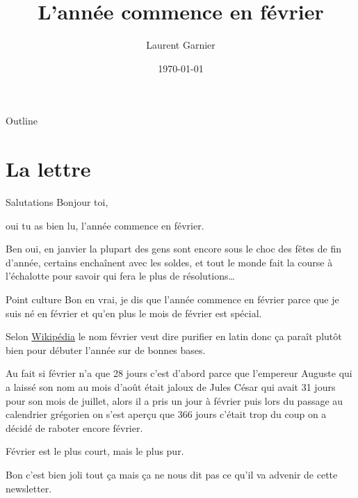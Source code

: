 \documentclass[presentation]{beamer}
\author{Laurent Garnier}
\date{\today}
\title{L'année commence en février}
\begin{document}
\maketitle
\begin{frame}{Outline}
\tableofcontents
\end{frame}


\section{La lettre}
\label{sec:org4ca9ffe}
\begin{frame}[label={sec:org9dab359}]{Salutations}
Bonjour toi,



oui tu as bien lu, l'année commence en février. 



Ben oui, en janvier la plupart des gens sont encore sous le choc des
fêtes de fin d'année, certains enchaînent avec les soldes, et tout le
monde fait la course à l'échalotte pour savoir qui fera le plus de
résolutions\ldots{}
\end{frame}



\begin{frame}[label={sec:org131f08e}]{Point culture}
Bon en vrai, je dis que l'année commence en février parce que je suis
né en février et qu'en plus le mois de février est spécial.




Selon \href{https://fr.wikipedia.org/wiki/F\%25C3\%25A9vrier}{Wikipédia} le nom février veut dire purifier en latin donc ça
paraît plutôt bien pour débuter l'année sur de bonnes bases. 




Au fait si février n'a que 28 jours c'est d'abord parce que l'empereur
Auguste qui a laissé son nom au mois d'août était jaloux de Jules
César qui avait 31 jours pour son mois de juillet, alors il a pris un
jour à février puis lors du passage au calendrier grégorien on s'est
aperçu que 366 jours c'était trop du coup on a décidé de raboter
encore février.




Février est le plus court, mais le plus pur.



Bon c'est bien joli tout ça mais ça ne nous dit pas ce qu'il va
advenir de cette newsletter.
\end{frame}
\end{document}
